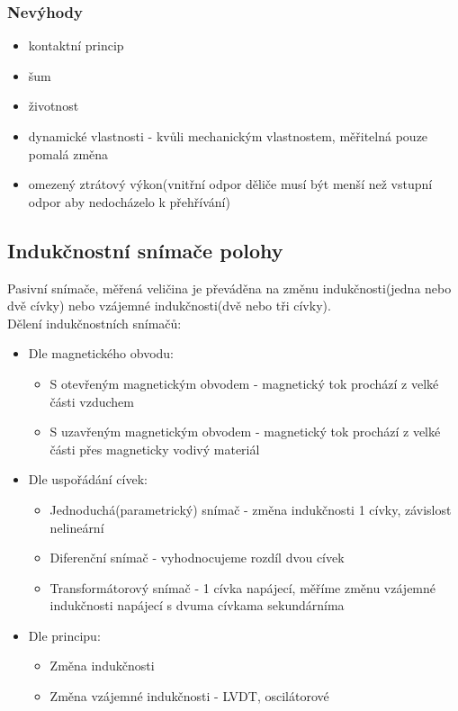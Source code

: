 \subsubsection{Nevýhody}
\begin{itemize}
    \item kontaktní princip
    \item šum
    \item životnost
    \item dynamické vlastnosti - kvůli mechanickým vlastnostem, měřitelná pouze pomalá změna
    \item omezený ztrátový výkon(vnitřní odpor děliče musí být menší než vstupní odpor aby nedocházelo k přehřívání)
\end{itemize}

\subsection{Indukčnostní snímače polohy}
Pasivní snímače, měřená veličina je převáděna na změnu indukčnosti(jedna nebo dvě cívky) nebo vzájemné indukčnosti(dvě nebo tři cívky).\\
Dělení indukčnostních snímačů:
\begin{itemize}
    \item Dle magnetického obvodu:
          \begin{itemize}
              \item S otevřeným magnetickým obvodem - magnetický tok prochází z velké části vzduchem
              \item S uzavřeným magnetickým obvodem - magnetický tok prochází z velké části přes magneticky vodivý materiál
          \end{itemize}
    \item Dle uspořádání cívek:
          \begin{itemize}
              \item Jednoduchá(parametrický) snímač - změna indukčnosti 1 cívky, závislost nelineární
              \item Diferenční snímač - vyhodnocujeme rozdíl dvou cívek
              \item Transformátorový snímač - 1 cívka napájecí, měříme změnu vzájemné indukčnosti napájecí s dvuma cívkama sekundárníma
          \end{itemize}
    \item Dle principu:
          \begin{itemize}
              \item Změna indukčnosti
              \item Změna vzájemné indukčnosti - LVDT, oscilátorové
          \end{itemize}
\end{itemize}


